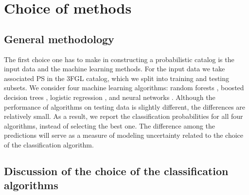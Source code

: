 \section{Choice of methods}

\subsection{General methodology}

The first choice one has to make in constructing a probabilistic catalog is the input data and the machine learning methods.
For the input data we take associated PS in the 3FGL catalog, which we split into training and testing subsets.
We consider four machine learning algorithms: random forests \citep[RF,][]{709601, Breiman:2001hzm}, 
boosted decision trees \citep[BDTs,][]{friedman2001},  
logistic regression \citep[LR,][]{cox1958}, 
and neural networks \citep[NN,][]{Hopfield:1982pe}.
Although the performance of algorithms on testing data is slightly different, the differences are relatively small.
As a result, we report the classification probabilities for all four algorithms, instead of selecting the best one.
The difference among the predictions will serve as a measure of modeling uncertainty related to the choice of the classification algorithm.

\subsection{Discussion of the choice of the classification algorithms}

